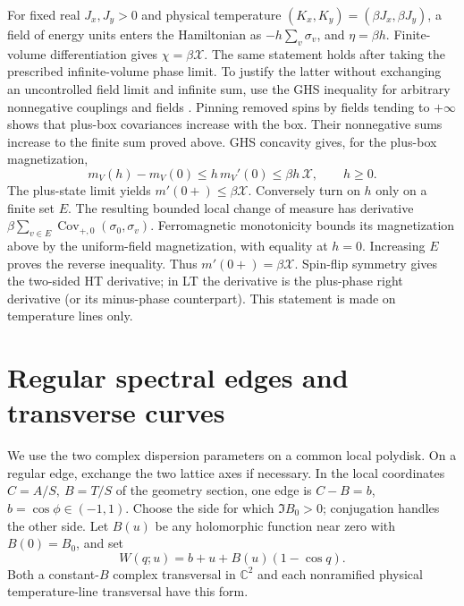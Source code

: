 \documentclass[11pt]{article}
\numberwithin{equation}{section}
\theoremstyle{definition}
\newcommand{\C}{\mathbb C}
\begin{document}
For fixed real \(J_x,J_y>0\) and physical temperature
\((K_x,K_y)=(\beta J_x,\beta J_y)\), a field of energy units enters
the Hamiltonian as \(-h\sum_v\sigma_v\), and \(\eta=\beta h\).
Finite-volume differentiation gives \(\chi=\beta\mathcal X\).
The same statement holds after taking the prescribed infinite-volume
phase limit. To justify the latter without exchanging an uncontrolled
field limit and infinite sum, use the GHS inequality for arbitrary
nonnegative couplings and fields \cite[Theorem 1.5]{CGN}.
Pinning removed spins by fields tending to \(+\infty\) shows that
plus-box covariances increase with the box. Their nonnegative sums
increase to the finite sum proved above. GHS concavity gives, for
the plus-box magnetization,
\[
 m_V(h)-m_V(0)\le h\,m_V'(0)
       \le\beta h\,\mathcal X,\qquad h\ge0.
\]
The plus-state limit yields \(m'(0+)\le\beta\mathcal X\).
Conversely turn on \(h\) only on a finite set \(E\). The resulting
bounded local change of measure has derivative
\(\beta\sum_{v\in E}\operatorname{Cov}_{+,0}(\sigma_0,\sigma_v)\).
Ferromagnetic monotonicity bounds its magnetization above by the
uniform-field magnetization, with equality at \(h=0\).
Increasing \(E\) proves the reverse inequality. Thus
\(m'(0+)=\beta\mathcal X\). Spin-flip symmetry gives the two-sided
HT derivative; in LT the derivative is the plus-phase right
derivative (or its minus-phase counterpart).
This statement is made on temperature lines only.

\section{Regular spectral edges and transverse curves}
\label{ana:edges}

We use the two complex dispersion parameters on a common local
polydisk.
On a regular edge, exchange the two lattice axes if necessary.
In the local coordinates \(C=A/S,\ B=T/S\) of the geometry section,
one edge is \(C-B=b\), \(b=\cos\phi\in(-1,1)\).
Choose the side for which \(\Im B_0>0\); conjugation handles the
other side. Let \(B(u)\) be any holomorphic function near zero with
\(B(0)=B_0\), and set
\begin{equation}\label{ana:edgecurve}
 W(q;u)=b+u+B(u)(1-\cos q).
\end{equation}
Both a constant-\(B\) complex transversal in \(\C^2\) and each
nonramified physical temperature-line transversal have this form.
\end{document}
